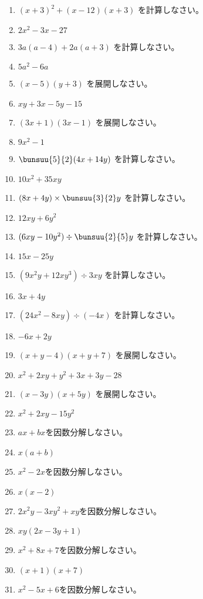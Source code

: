 \documentclass[uplatex,a4j,11pt]{jsreport}
\begin{document}
\begin{multicols}{2}
\begin{enumerate}
    \item $(x+3)^2+(x-12)(x+3)$ を計算しなさい。%
    \item $2x^2-3x-27$
    \item $3a(a-4)+2a(a+3)$ を計算しなさい。%
    \item $5a^2-6a$
    \item $(x-5)(y+3)$ を展開しなさい。%
    \item $xy+3x-5y-15$
    \item $(3x+1)(3x-1)$ を展開しなさい。%
    \item $9x^2-1$
    \item $\bunsuu{5}{2}(4x+14y)$ を計算しなさい。%
    \item $10x^2+35xy$
    \item $(8x+4y)\times\bunsuu{3}{2}y$ を計算しなさい。%
    \item $12xy+6y^2$
    \item $(6xy-10y^2)\div\bunsuu{2}{5}y$ を計算しなさい。%
    \item $15x-25y$
    \item $(9x^2y+12xy^3)\div3xy$ を計算しなさい。%
    \item $3x+4y$
    \item $(24x^2-8xy)\div(-4x)$ を計算しなさい。%
    \item $-6x+2y$
    \item $(x+y-4)(x+y+7)$ を展開しなさい。%
    \item $x^2+2xy+y^2+3x+3y-28$
    \item $(x-3y)(x+5y)$ を展開しなさい。%
    \item $x^2+2xy-15y^2$
    \item $ax+bx$を因数分解しなさい。%
    \item $x(a+b)$
    \item $x^2-2x$を因数分解しなさい。%
    \item $x(x-2)$
    \item $2x^2y-3xy^2+xy$を因数分解しなさい。%
    \item $xy(2x-3y+1)$
    \item $x^2+8x+7$を因数分解しなさい。%
    \item $(x+1)(x+7)$
    \item $x^2-5x+6$を因数分解しなさい。%

\end{enumerate}
\end{multicols}
\end{document}
